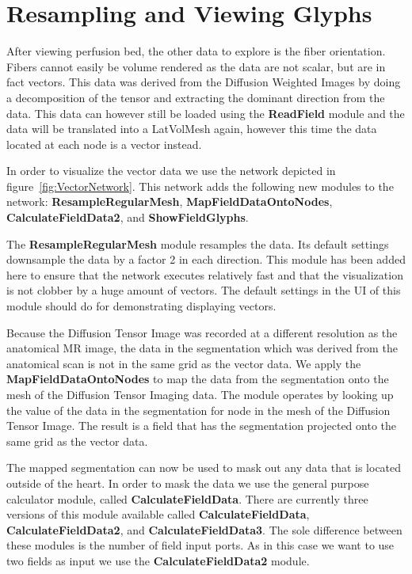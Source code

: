 \documentclass[fleqn,11pt,openany]{book}
\begin{document}
\section{Resampling and Viewing Glyphs}

After viewing perfusion bed, the other data to explore is the fiber orientation. Fibers cannot easily be volume rendered as the data are not scalar, but are in fact vectors. This data was derived from the Diffusion Weighted Images by doing a decomposition of the tensor and extracting the dominant direction from the data. This data can however still be loaded using the {\bf ReadField} module and the data will be translated into a LatVolMesh again, however this time the data located at each node is a vector instead.

In order to visualize the vector data we use the network depicted in figure~\ref{fig:VectorNetwork}. This network adds the following new modules to the network: {\bf ResampleRegularMesh}, {\bf MapFieldDataOntoNodes}, {\bf CalculateFieldData2}, and {\bf ShowFieldGlyphs}. 

The {\bf ResampleRegularMesh} module resamples the data. Its default settings downsample the data by a factor 2 in each direction. This module has been added here to ensure that the network executes relatively fast and that the visualization is not clobber by a huge amount of vectors. The default settings in the UI of this module should do for demonstrating displaying vectors.

Because the Diffusion Tensor Image was recorded at a different resolution as the anatomical MR image, the data in the segmentation which was derived from the anatomical scan is not in the same grid as the vector data. We apply the  {\bf MapFieldDataOntoNodes} to map the data from the segmentation onto the mesh of the Diffusion Tensor Imaging data. The module operates by looking up the value of the data in the segmentation for node in the mesh of the Diffusion Tensor Image. The result is a field that has the segmentation projected onto the same grid as the vector data.

The mapped segmentation can now be used to mask out any data that is located outside of the heart. In order to mask the data we use the general purpose calculator module, called {\bf CalculateFieldData}. There are currently three versions of this module available called  {\bf CalculateFieldData}, {\bf CalculateFieldData2}, and {\bf CalculateFieldData3}. The sole difference between these modules is the number of field input ports. As in this case we want to use two fields as input we use the {\bf CalculateFieldData2} module.
\end{document}
